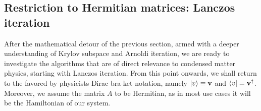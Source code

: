 \subsection{Restriction to Hermitian matrices: Lanczos iteration}

After the mathematical detour of the previous section, armed with a deeper understanding of Krylov subspace and
Arnoldi iteration, we are ready to investigate the algorithms that are of direct relevance to condensed
matter physics, starting with Lanczos iteration. From this point onwards, we shall return to the favored by physicists
Dirac bra-ket notation, namely \(\ket{v} \equiv \vectorbold{v}\) and \(\bra{v} = \vectorbold{v}^{\dagger}\).
Moreover, we assume the matrix \(A\) to be Hermitian, as in most use cases it will be the Hamiltonian of our system. 

